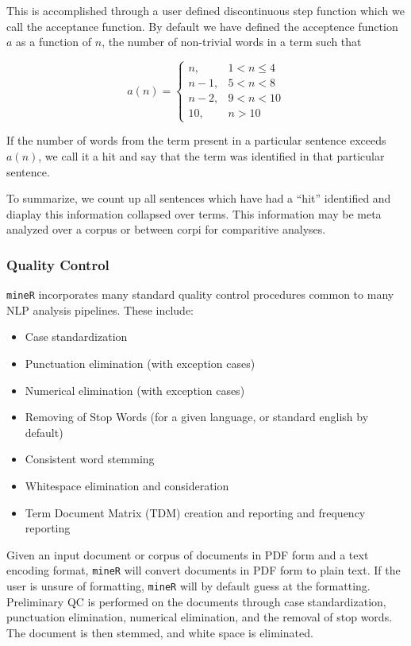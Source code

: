\documentclass[twoside]{article}
\begin{document}
This is accomplished through a user defined discontinuous step function which we call the acceptance function. By default we have defined the acceptence function $a$ as a function of $n$, the number of non-trivial words in a term such that 

$$  a(n) = \begin{cases} n, & 1 < n \leq 4 \\ n-1, & 5 < n < 8 \\ n-2, & 9 < n < 10 \\ 10, & n > 10 \end{cases} $$

If the number of words from the term present in a particular sentence exceeds $a(n)$, we call it a hit and say that the term was identified in that particular sentence. 

To summarize, we count up all sentences which have had a ``hit'' identified and diaplay this information collapsed over terms. This information may be meta analyzed over a corpus or between corpi for comparitive analyses. 

\subsubsection{Quality Control}

\texttt{mineR} incorporates many standard quality control procedures common to many NLP analysis pipelines. These include:

\begin{itemize}
  \item Case standardization
  \item Punctuation elimination (with exception cases)
  \item Numerical elimination (with exception cases)
  \item Removing of Stop Words (for a given language, or standard english by default)
  \item Consistent word stemming
  \item Whitespace elimination and consideration
  \item Term Document Matrix (TDM) creation and reporting and frequency reporting
\end{itemize}

Given an input document or corpus of documents in PDF form and a text encoding format, \texttt{mineR} will convert documents in PDF form to plain text.  If the user is unsure of formatting, \texttt{mineR} will by default guess at the formatting. Preliminary QC is performed on the documents through case standardization, punctuation elimination, numerical elimination, and the removal of stop words.  The document is then stemmed, and white space is eliminated.
\end{document}
